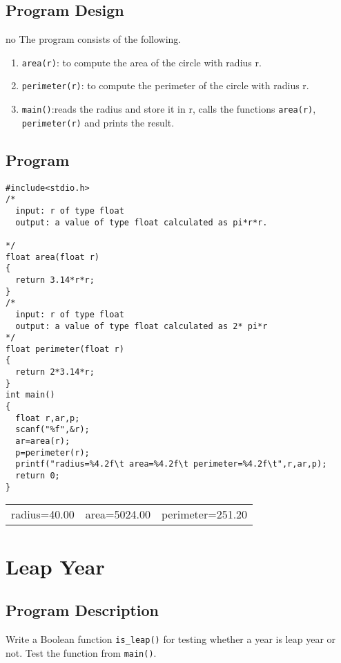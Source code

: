 \documentclass[11pt]{article}
\begin{document}
\subsection*{Program Design}
\label{sec-3-3}
no   The program consists of the following.
\begin{enumerate}
\item \texttt{area(r)}: to compute the area of the circle with radius r.
\item \texttt{perimeter(r)}: to compute the perimeter of the circle with radius r.
\item \texttt{main()}:reads the radius and store it in r,
calls  the functions \texttt{area(r)}, \texttt{perimeter(r)} and prints the result.
\end{enumerate}

\subsection*{Program}
\label{sec-3-4}
\begin{verbatim}
#include<stdio.h>
/*
  input: r of type float
  output: a value of type float calculated as pi*r*r.

*/
float area(float r)
{
  return 3.14*r*r;
}
/*
  input: r of type float
  output: a value of type float calculated as 2* pi*r
*/
float perimeter(float r)
{
  return 2*3.14*r;
}
int main()
{
  float r,ar,p;
  scanf("%f",&r);
  ar=area(r);
  p=perimeter(r);
  printf("radius=%4.2f\t area=%4.2f\t perimeter=%4.2f\t",r,ar,p);
  return 0;
}
\end{verbatim}

\begin{center}
\begin{tabular}{lll}
radius=40.00 & area=5024.00 & perimeter=251.20\\
\end{tabular}
\end{center}

\section{Leap Year}
\label{sec-4}

\subsection*{Program Description}
\label{sec-4-1}
Write a Boolean function \texttt{is\_leap()} for testing whether a year
is leap year or not. Test the function from \texttt{main()}.
\end{document}
